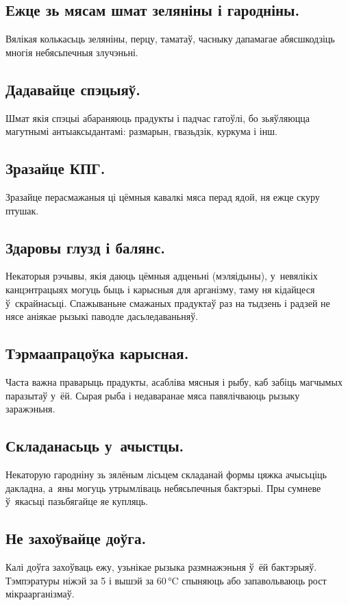 \subsection{Ежце зь мясам шмат зеляніны і гародніны.}
Вялікая колькасьць зеляніны, перцу, таматаў, часныку дапамагае абясшкодзіць многія небясьпечныя злучэньні.


\subsection{Дадавайце спэцыяў.}
Шмат якія спэцыі абараняюць прадукты і падчас гатоўлі, бо зьяўляюцца магутнымі антыаксыдантамі: размарын, гвазьдзік, куркума і інш.

\subsection{Зразайце КПГ.}
Зразайце перасмажаныя ці цёмныя кавалкі мяса перад ядой, ня ежце скуру птушак.

\subsection{Здаровы глузд і балянс.}
Некаторыя рэчывы, якія даюць цёмныя адценьні (мэляідыны), у~невялікіх канцэнтрацыях могуць быць і карысныя для арганізму, таму ня кідайцеся ў~скрайнасьці. Спажываньне смажаных прадуктаў раз на тыдзень і радзей не нясе аніякае рызыкі паводле дасьледаваньняў.

\subsection{Тэрмаапрацоўка карысная.}
Часта важна праварыць прадукты, асабліва мясныя і рыбу, каб забіць магчымых паразытаў у~ёй. Сырая рыба і недаваранае мяса павялічваюць рызыку заражэньня.

\subsection{Складанасьць у~ачыстцы.}
Некаторую гародніну зь зялёным лісьцем складанай формы цяжка ачысьціць дакладна, а~яны могуць утрымліваць небясьпечныя бактэрыі. Пры сумневе ў~якасьці пазьбягайце яе купляць.

\subsection{Не захоўвайце доўга.}
Калі доўга захоўваць ежу, узьнікае рызыка размнажэньня ў~ёй бактэрыяў. Тэмпэратуры ніжэй за 5 і вышэй за 60\,°C спыняюць або запавольваюць рост мікраарганізмаў.

